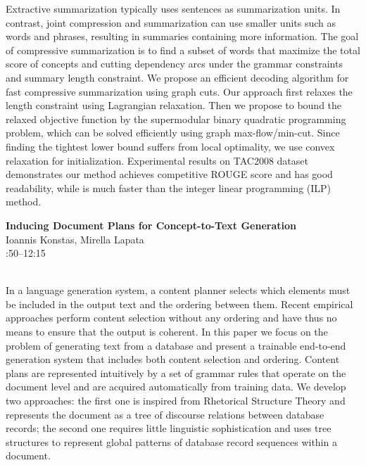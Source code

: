 \documentclass[twoside,makeidx]{book}
\renewcommand{\normalsize}{\fontsize{8}{9}\selectfont}
\renewcommand{\small}{\fontsize{7}{8}\selectfont}
\begin{document}
\nopagebreak%
\noindent%
{\small Extractive summarization typically uses sentences as summarization units. In contrast, joint compression and summarization can use smaller units such as words and phrases, resulting in summaries containing more information. The goal of compressive summarization is to find a subset of words that maximize the total score of concepts and cutting dependency arcs under the grammar constraints and summary length constraint. We propose an efficient decoding algorithm for fast compressive summarization using graph cuts. Our approach first relaxes the length constraint using Lagrangian relaxation. Then we propose to bound the relaxed objective function by the supermodular binary quadratic programming problem, which can be solved efficiently using graph max-flow/min-cut. Since finding the tightest lower bound suffers from local optimality, we use convex relaxation for initialization. Experimental results on TAC2008 dataset demonstrates our method achieves competitive ROUGE score and has good readability, while is much faster than the  integer linear programming (ILP) method.}
\par\vspace{2em}\noindent%
\begin{minipage}{\linewidth}%
\begin{center}
\textbf{\normalsize Inducing Document Plans for Concept-to-Text Generation}\\
\normalsize  Ioannis Konstas,  Mirella Lapata\\
{\small 11:50--12:15}\\
\end{center}
\end{minipage}\\[0.5em]
\nopagebreak%
\noindent%
{\small In a language generation system, a content planner selects which   elements must be included in the output text and the ordering   between them. Recent empirical approaches perform content selection   without any ordering and have thus no means to ensure that the   output is coherent.  In this paper we focus on the problem of   generating text from a database and present a trainable end-to-end   generation system that includes both content selection and ordering.   Content plans are represented intuitively by a set of grammar rules   that operate on the document level and are acquired automatically   from training data. We develop two approaches: the first one is   inspired from Rhetorical Structure Theory and represents the   document as a tree of discourse relations between database records;   the second one requires little linguistic sophistication and uses   tree structures to represent global patterns of database record   sequences within a document.}
\end{document}
